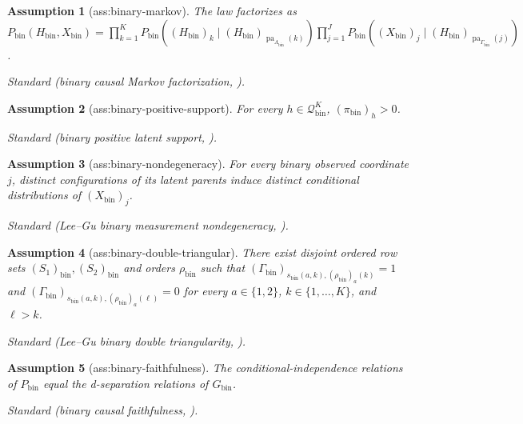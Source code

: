 \documentclass{article}
\newtheorem{assumption}{Assumption}
\begin{document}
\begin{assumption}[ass:binary-markov]\label{ass:binary-markov}
The law factorizes as \(P_{\mathrm{bin}}(H_{\mathrm{bin}},X_{\mathrm{bin}})=\prod_{k=1}^KP_{\mathrm{bin}}((H_{\mathrm{bin}})_k\mid(H_{\mathrm{bin}})_{\operatorname{pa}_{\Lambda_{\mathrm{bin}}}(k)})\prod_{j=1}^JP_{\mathrm{bin}}((X_{\mathrm{bin}})_j\mid(H_{\mathrm{bin}})_{\operatorname{pa}_{\Gamma_{\mathrm{bin}}}(j)})\).
\par\smallskip\noindent\emph{Standard} (binary causal Markov factorization, \cite{LeeGu2026DTBLCM}).
\end{assumption}

\begin{assumption}[ass:binary-positive-support]\label{ass:binary-positive-support}
For every \(h\in\mathcal Q_{\mathrm{bin}}^K\), \((\pi_{\mathrm{bin}})_h>0\).
\par\smallskip\noindent\emph{Standard} (binary positive latent support, \cite{LeeGu2026DTBLCM}).
\end{assumption}

\begin{assumption}[ass:binary-nondegeneracy]\label{ass:binary-nondegeneracy}
For every binary observed coordinate \(j\), distinct configurations of its latent parents induce distinct conditional distributions of \((X_{\mathrm{bin}})_j\).
\par\smallskip\noindent\emph{Standard} (Lee--Gu binary measurement nondegeneracy, \cite{LeeGu2026DTBLCM}).
\end{assumption}

\begin{assumption}[ass:binary-double-triangular]\label{ass:binary-double-triangular}
There exist disjoint ordered row sets \((S_1)_{\mathrm{bin}},(S_2)_{\mathrm{bin}}\) and orders \(\rho_{\mathrm{bin}}\) such that \((\Gamma_{\mathrm{bin}})_{s_{\mathrm{bin}}(a,k),(\rho_{\mathrm{bin}})_a(k)}=1\) and \((\Gamma_{\mathrm{bin}})_{s_{\mathrm{bin}}(a,k),(\rho_{\mathrm{bin}})_a(\ell)}=0\) for every \(a\in\{1,2\}\), \(k\in\{1,\ldots,K\}\), and \(\ell>k\).
\par\smallskip\noindent\emph{Standard} (Lee--Gu binary double triangularity, \cite{LeeGu2026DTBLCM}).
\end{assumption}

\begin{assumption}[ass:binary-faithfulness]\label{ass:binary-faithfulness}
The conditional-independence relations of \(P_{\mathrm{bin}}\) equal the d-separation relations of \(G_{\mathrm{bin}}\).
\par\smallskip\noindent\emph{Standard} (binary causal faithfulness, \cite{LeeGu2026DTBLCM}).
\end{assumption}
\end{document}
